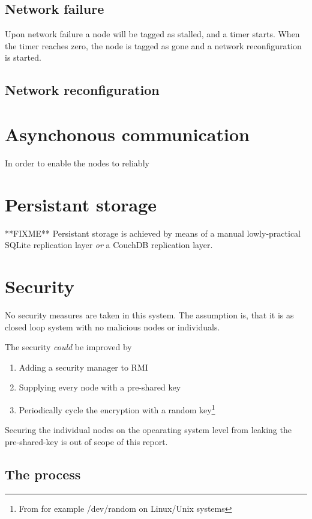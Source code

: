 \documentclass[10pt,a4paper]{article}
\begin{document}
\subsection{Network failure}

Upon network failure a node will be tagged as stalled, and a timer starts. When the timer reaches zero, the node is tagged as gone and a network reconfiguration is started.

\subsection{Network reconfiguration}

\section{Asynchonous communication}
In order to enable the nodes to reliably 

\section{Persistant storage}
**FIXME** Persistant storage is achieved by means of a manual lowly-practical SQLite replication layer \emph{or} a CouchDB replication layer.

\section{Security}
No security measures are taken in this system. The assumption is, that it is as closed loop system with no malicious nodes or individuals.

The security \emph{could} be improved by 
\begin{enumerate}
\item Adding a security manager to RMI
\item Supplying every node with a pre-shared key
\item Periodically cycle the encryption with a random key\footnote{From for example /dev/random on Linux/Unix systems}
\end{enumerate}
Securing the individual nodes on the opearating system level from leaking the pre-shared-key is out of scope of this report.

\subsection{The process}
\end{document}
